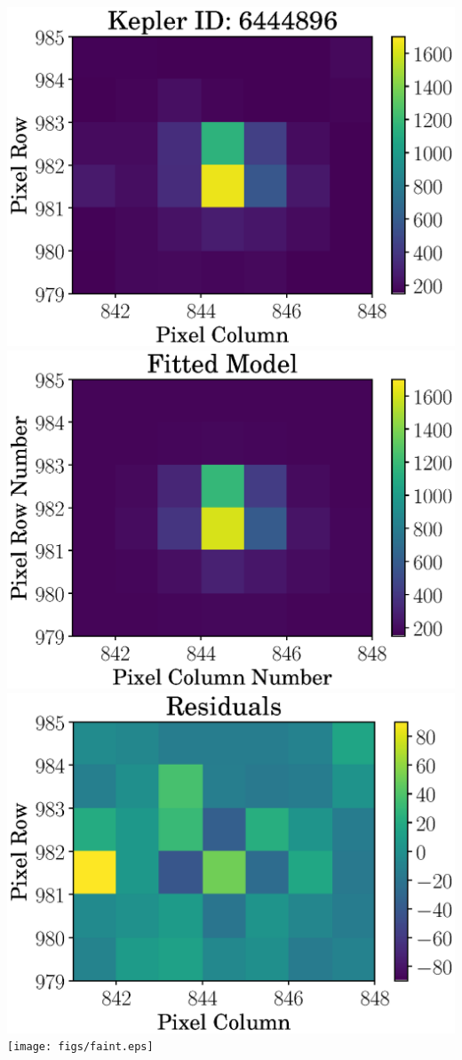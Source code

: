 \documentclass[landscape,a0b,final]{a0poster}
\newenvironment{poster}{
  \begin{center}
  \begin{minipage}[c]{0.98\textwidth}
}{
  \end{minipage}
  \end{center}
}
\newenvironment{pcolumn}[1]{
  \begin{minipage}{#1\textwidth}
  \begin{center}
}{
  \end{center}
  \end{minipage}
}
\begin{document}
\begin{poster}
\begin{center}
\begin{pcolumn}{0.32}
{    \begin{center}
\includegraphics[width=16cm,angle=0]{figs/tpf_kep.eps}
\includegraphics[width=16cm,angle=0]{figs/model_kep.eps}
\includegraphics[width=16cm,angle=0]{figs/residuals_kep.eps}
\texttt{[image: figs/faint.eps]}
    \end{center}

}
\end{pcolumn}
\end{center}
\end{poster}
\end{document}
